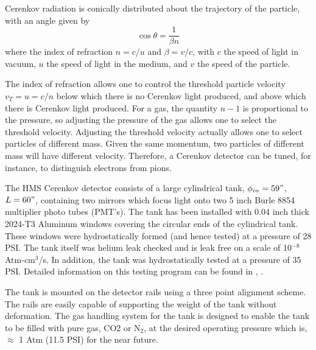 {Cerenkov radiation is conically distributed about the trajectory of the
particle, with an angle given by
$$
	\cos{\theta} = \frac{1}{\beta n}
$$
where the index of refraction $n = c/u$ and $\beta = v/c$, with $c$
the speed of light in vacuum, $u$ the speed of light in the medium,
and $v$ the speed of the particle.

The index of refraction allows one to control the threshold particle velocity
$v_{T}=u=c/n$ below which there is no Cerenkov light produced, and above which there
is Cerenkov light produced.  For a gas, the quantity $n-1$ is proportional to the pressure,
so adjusting the pressure of the gas allows one to select the
threshold velocity. Adjusting the threshold velocity actually allows one to select particles of
different mass.  Given the same momentum, two particles of different mass
will have different velocity.  Therefore, a Cerenkov detector can be tuned,
for instance, to distinguish electrons from pions.

	The HMS Cerenkov detector consists of a large cylindrical
tank, $\phi_{in} = 59"$, $L = 60"$, containing two mirrors which focus
light onto two 5 inch Burle 8854 multiplier photo  tubes (PMT's). The tank
has been installed with 0.04 inch thick 2024-T3 Aluminum windows
covering the circular ends of the cylindrical tank. These
windows were hydrostatically formed (and hence tested) at a pressure
of 28 PSI. The tank itself was helium leak checked and is leak free
on a scale of 10$^{-8}$ Atm-cm$^3$/s. In addition, the tank was hydrostatically
tested at a pressure of 35 PSI. Detailed information on this testing
program can be found in \cite {bi:tank}, \cite {bi:wind}.

The tank is mounted on the detector rails using a three point
alignment scheme. The rails are easily capable of supporting the
weight of the tank without deformation.
The gas handling system for the tank
is designed to enable the tank to be filled with
pure gas, CO2 or N$_2$, at the desired operating
pressure which is, $\approx$ 1 Atm (11.5 PSI) for the near future.

}

